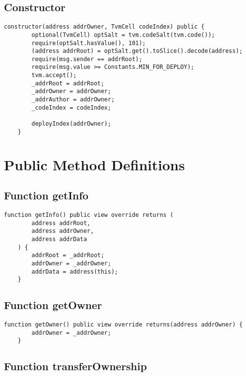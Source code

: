 \subsection{Constructor}



\begin{lstlisting}[firstnumber=20]
    constructor(address addrOwner, TvmCell codeIndex) public {
        optional(TvmCell) optSalt = tvm.codeSalt(tvm.code());
        require(optSalt.hasValue(), 101);
        (address addrRoot) = optSalt.get().toSlice().decode(address);
        require(msg.sender == addrRoot);
        require(msg.value >= Constants.MIN_FOR_DEPLOY);
        tvm.accept();
        _addrRoot = addrRoot;
        _addrOwner = addrOwner;
        _addrAuthor = addrOwner;
        _codeIndex = codeIndex;

        deployIndex(addrOwner);
    }
\end{lstlisting}

\section{Public Method Definitions}


\subsection{Function getInfo}

\begin{lstlisting}[firstnumber=59]
    function getInfo() public view override returns (
        address addrRoot,
        address addrOwner,
        address addrData
    ) {
        addrRoot = _addrRoot;
        addrOwner = _addrOwner;
        addrData = address(this);
    }
\end{lstlisting}

\subsection{Function getOwner}

\begin{lstlisting}[firstnumber=69]
    function getOwner() public view override returns(address addrOwner) {
        addrOwner = _addrOwner;
    }
\end{lstlisting}

\subsection{Function transferOwnership}

